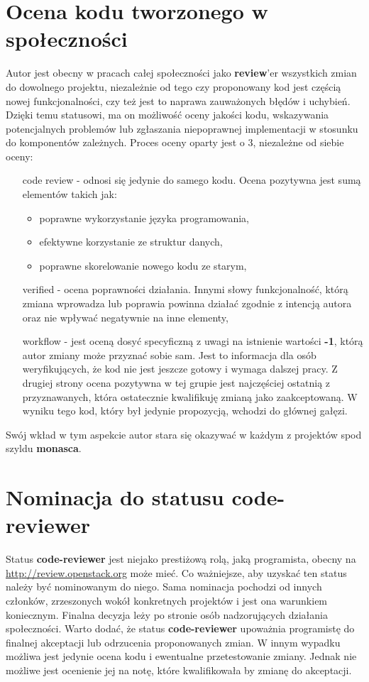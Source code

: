 \section{Ocena kodu tworzonego w społeczności}
    Autor jest obecny w pracach całej społeczności jako \textbf{review}'er wszystkich zmian do dowolnego projektu, 
    niezależnie od tego czy proponowany kod jest częścią nowej funkcjonalności, czy też jest to naprawa zauważonych błędów i 
    uchybień. Dzięki temu statusowi, ma on możliwość oceny jakości kodu, wskazywania potencjalnych problemów lub zgłaszania 
    niepoprawnej implementacji w stosunku do komponentów zależnych.
    Proces oceny oparty jest o 3, niezależne od siebie oceny:
    \begin{itemize}
        \item[code review] - odnosi się jedynie do samego kodu. Ocena pozytywna jest sumą elementów takich jak:
        \begin{itemize}
            \item poprawne wykorzystanie języka programowania,
            \item efektywne korzystanie ze struktur danych,
            \item poprawne skorelowanie nowego kodu ze starym,
        \end{itemize}
        \item[verified] -  ocena poprawności działania. Innymi słowy funkcjonalność, którą zmiana wprowadza lub poprawia powinna działać
        zgodnie z intencją autora oraz nie wpływać negatywnie na inne elementy,
        \item[workflow] - jest oceną dosyć specyficzną z uwagi na istnienie wartości \textbf{-1}, którą autor zmiany może przyznać sobie sam.
        Jest to informacja dla osób weryfikujących, że kod nie jest jeszcze gotowy i wymaga dalszej pracy. Z drugiej strony ocena pozytywna w tej grupie
        jest najczęściej ostatnią z przyznawanych, która ostatecznie kwalifikuję zmianą jako zaakceptowaną. W wyniku tego kod, który był
        jedynie propozycją, wchodzi do głównej gałęzi.
    \end{itemize}
    Swój wkład w tym aspekcie autor stara się okazywać w każdym z projektów spod szyldu \textbf{monasca}.

\section{Nominacja do statusu code-reviewer}
    Status \textbf{code-reviewer} jest niejako prestiżową rolą, jaką programista, obecny na 
    \url{http://review.openstack.org} może mieć. Co ważniejsze, aby uzyskać ten status należy być nominowanym do niego. Sama 
    nominacja pochodzi od innych członków, zrzeszonych wokół konkretnych projektów i jest ona warunkiem koniecznym. 
    Finalna decyzja leży po stronie osób nadzorujących działania społeczności.
    Warto dodać, że status \textbf{code-reviewer} upoważnia programistę do finalnej akceptacji lub odrzucenia proponowanych 
    zmian. W innym wypadku możliwa jest jedynie ocena kodu i ewentualne przetestowanie zmiany. Jednak nie możliwe jest 
    ocenienie jej na notę, które kwalifikowała by zmianę do akceptacji.